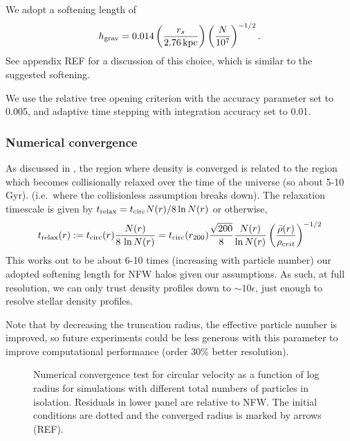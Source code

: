 We adopt a softening length of \begin{equation}
h_{\rm grav} = 0.014 \left(\frac{r_s}{2.76\,{\rm kpc}}\right)\left(\frac{N}{10^7}\right)^{-1/2}.
\end{equation} See appendix REF for a discussion of this choice, which
is similar to the \citet{power+2003} suggested softening.

We use the relative tree opening criterion with the accuracy parameter
set to 0.005, and adaptive time stepping with integration accuracy set
to 0.01.

\subsubsection{Numerical convergence}\label{numerical-convergence}

As discussed in \citet{power+2003}, the region where density is
converged is related to the region which becomes collisionally relaxed
over the time of the universe (so about 5-10 Gyr). (i.e.~where the
collisionless assumption breaks down). The relaxation timescale is given
by \(t_{\rm relax} = t_{\rm circ} N(r) / 8\ln N(r)\) or otherwise,
\begin{equation}
t_{\rm relax}(r) := t_{\rm circ}(r) \frac{N(r)}{8\,\ln N(r)}
= {t_{\rm circ}(r_{200})} \frac{\sqrt{200}}{8} \frac{N(r)}{\ln N(r)} \left(\frac{\bar \rho (r)}{\rho_{\textrm crit}}\right)^{-1/2}
\end{equation} This works out to be about 6-10 times (increasing with
particle number) our adopted softening length for NFW halos given our
assumptions. As such, at full resolution, we can only trust density
profiles down to \(\sim10\epsilon\), just enough to resolve stellar
density profiles.

Note that by decreasing the truncation radius, the effective particle
number is improved, so future experiments could be less generous with
this parameter to improve computational performance (order 30\% better
resolution).

\begin{figure}
\centering
{}
\caption[Numerical halo convergence]{Numerical convergence test for
circular velocity as a function of log radius for simulations with
different total numbers of particles in isolation. Residuals in lower
panel are relative to NFW. The initial conditions are dotted and the
converged radius is marked by arrows
(REF).}\label{fig:numerical_convergance}
\end{figure}

